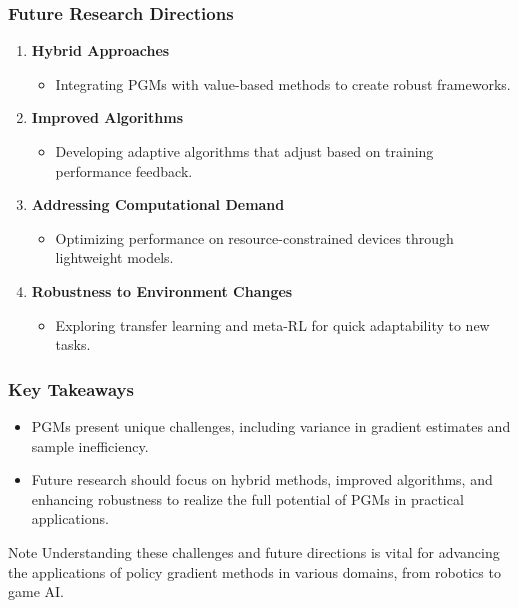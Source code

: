 \documentclass[aspectratio=169]{beamer}
\begin{document}
\begin{frame}[fragile]
    \frametitle{Future Research Directions}
    \begin{enumerate}
        \item \textbf{Hybrid Approaches}
            \begin{itemize}
                \item Integrating PGMs with value-based methods to create robust frameworks.
            \end{itemize}
        \item \textbf{Improved Algorithms}
            \begin{itemize}
                \item Developing adaptive algorithms that adjust based on training performance feedback.
            \end{itemize}
        \item \textbf{Addressing Computational Demand}
            \begin{itemize}
                \item Optimizing performance on resource-constrained devices through lightweight models.
            \end{itemize}
        \item \textbf{Robustness to Environment Changes}
            \begin{itemize}
                \item Exploring transfer learning and meta-RL for quick adaptability to new tasks.
            \end{itemize}
    \end{enumerate}
\end{frame}

\begin{frame}[fragile]
    \frametitle{Key Takeaways}
    \begin{itemize}
        \item PGMs present unique challenges, including variance in gradient estimates and sample inefficiency.
        \item Future research should focus on hybrid methods, improved algorithms, and enhancing robustness to realize the full potential of PGMs in practical applications.
    \end{itemize}
    \begin{block}{Note}
        Understanding these challenges and future directions is vital for advancing the applications of policy gradient methods in various domains, from robotics to game AI.
    \end{block}
\end{frame}
\end{document}
